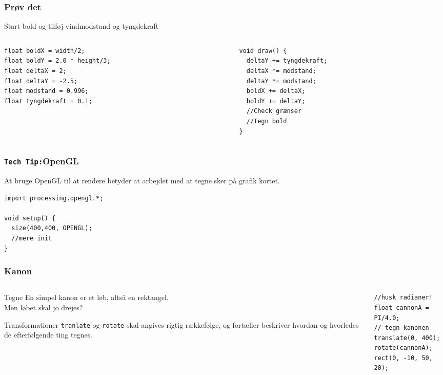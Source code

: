 \documentclass{beamer}
\begin{document}
\begin{frame}[fragile]
  \frametitle{Prøv det}
  Start bold og tilføj vindmodstand og tyngdekraft
  \begin{columns}
    \begin{column}{0.5\textwidth}
\begin{verbatim}
float boldX = width/2;
float boldY = 2.0 * height/3;
float deltaX = 2;
float deltaY = -2.5;
float modstand = 0.996;
float tyngdekraft = 0.1;
\end{verbatim}
    \end{column}
    \begin{column}{0.5\textwidth}
\begin{verbatim} 
void draw() {
  deltaY += tyngdekraft;
  deltaX *= modstand;
  deltaY *= modstand;
  boldX += deltaX;
  boldY += deltaY;
  //Check grænser
  //Tegn bold
}
\end{verbatim}

    \end{column}
  \end{columns}
\end{frame}


\begin{frame}[fragile]
  \frametitle{\texttt{Tech Tip:}OpenGL}

  At bruge OpenGL til at rendere betyder at arbejdet med at tegne sker
  på grafik kortet.

\begin{verbatim}
import processing.opengl.*;

void setup() {
  size(400,400, OPENGL);
  //mere init
}
\end{verbatim}
\end{frame}

\begin{frame}[fragile]
  \frametitle{Kanon}
  
  \begin{columns}
    \begin{column}{0.5\textwidth}
      
      \begin{block}{Tegne}
        En simpel kanon er et løb, altså en rektangel. \\
        Men løbet skal jo drejes?
      \end{block}

      \begin{block}{Transformationer}
        \texttt{tranlate} og \texttt{rotate} skal angives rigtig
        rækkefølge, og fortæller beskriver hvordan og hvorledes de
        efterfølgende ting tegnes.
      \end{block}

      
    \end{column}
    \begin{column}{0.5\textwidth}
\begin{verbatim} 
//husk radianer!
float cannonA = PI/4.0; 
// tegn kanonen
translate(0, 400);
rotate(cannonA); 
rect(0, -10, 50, 20);

\end{verbatim}
    \end{column}
  \end{columns}
\end{frame}
\end{document}
